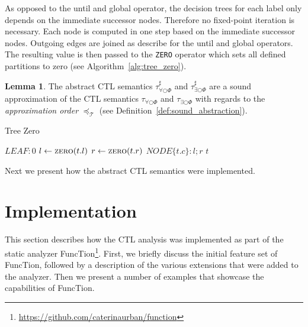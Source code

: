 \documentclass[11pt,a4paper,titlepage]{article}
\theoremstyle{definition}
\newtheorem{lemma}[theorem]{Lemma}
\begin{document}
As opposed to the \textsf{until} and \textsf{global} operator, the decision trees for each label only depends on the immediate successor nodes.
Therefore no fixed-point iteration is necessary. Each node is computed in one step based on the immediate successor nodes.
Outgoing edges are joined as describe for the \textsf{until} and \textsf{global} operators. 
The resulting value is then passed to the \texttt{ZERO}
operator which sets all defined partitions to zero (see Algorithm~\ref{alg:tree_zero}).


\begin{lemma}
    The abstract CTL semantics 
    $\tau^{\sharp}_{\forall\bigcirc\Phi}$ and $\tau^{\sharp}_{\exists\bigcirc\Phi}$
    are a sound approximation of the CTL semantics
    $\tau_{\forall\bigcirc\Phi}$ and $\tau_{\exists\bigcirc\Phi}$
    with regards to the \textit{approximation order} $\preceq_\mathcal{T}$ (see Definition~\ref{def:sound_abstraction}).
\end{lemma}


\begin{algorithm}                      
    \caption{Tree Zero}         
    \label{alg:tree_zero}       
    \begin{algorithmic}
                \State \Return $LEAF: 0$
                \State $l \gets \Call{zero}{t.l}$
                \State $r \gets \Call{zero}{t.r}$
                \State \Return $NODE\{t.c \}: l ; r$
            \Else
                \State \Return $t$
            \EndIf 
        \EndFunction
\end{algorithmic}
\end{algorithm}

Next we present how the abstract CTL semantics were implemented.

\section{Implementation}\label{sec:implementation}

This section describes how the CTL analysis was implemented as part of the static analyzer
FuncTion\footnote{\url{https://github.com/caterinaurban/function}}. 
First, we briefly discuss the initial feature set of FuncTion, 
followed by a description of the various extensions that were added to the analyzer. 
Then we present a number of examples that showcase the capabilities of FuncTion.
\end{document}
